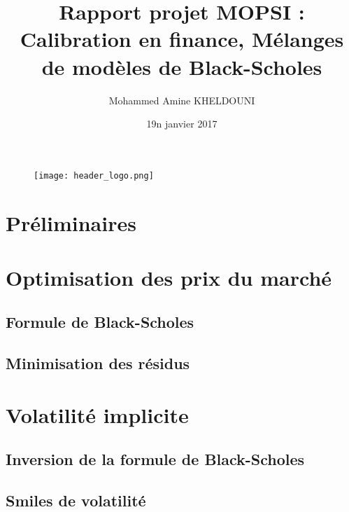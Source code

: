 \documentclass[12pt]{article}
\begin{document}
\begin{figure}[t]
\begin{center}
	\texttt{[image: header\_logo.png]}
\end{center}
\end{figure}

\title{Rapport projet MOPSI : Calibration en finance, Mélanges de modèles de Black-Scholes}
\author{Mohammed Amine KHELDOUNI}
\date{19n janvier 2017}
\maketitle
\renewcommand{\contentsname}{Table des matières}
\tableofcontents
\newpage
\section{Préliminaires}

\section{Optimisation des prix du marché}
\subsection{Formule de Black-Scholes}
\subsection{Minimisation des résidus}

\section{Volatilité implicite}
\subsection{Inversion de la formule de Black-Scholes}
\subsection{Smiles de volatilité}
\end{document}
